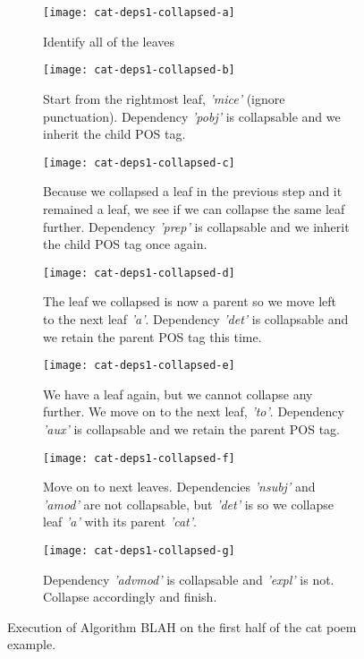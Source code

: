 \begin{figure}[h!]
\centering
\begin{subfigure}[t]{0.9\textwidth}
	\centering
    \texttt{[image: cat-deps1-collapsed-a]}
    \caption{Identify all of the leaves}
\end{subfigure}
\begin{subfigure}[t]{0.9\textwidth}
	\centering
    \texttt{[image: cat-deps1-collapsed-b]}
    \caption{Start from the rightmost leaf, \textit{'mice'} (ignore punctuation). Dependency \textit{'pobj'} is collapsable and we inherit the child POS tag.}
\end{subfigure}
\begin{subfigure}[t]{0.9\textwidth}
	\centering
    \texttt{[image: cat-deps1-collapsed-c]}
    \caption{Because we collapsed a leaf in the previous step and it remained a leaf, we see if we can collapse the same leaf further. Dependency \textit{'prep'} is collapsable and we inherit the child POS tag once again.}
\end{subfigure}
\begin{subfigure}[t]{0.9\textwidth}
	\centering
    \texttt{[image: cat-deps1-collapsed-d]}
    \caption{The leaf we collapsed is now a parent so we move left to the next leaf \textit{'a'}. Dependency \textit{'det'} is collapsable and we retain the parent POS tag this time.}
\end{subfigure}
\begin{subfigure}[t]{0.9\textwidth}
	\centering
    \texttt{[image: cat-deps1-collapsed-e]}
    \caption{We have a leaf again, but we cannot collapse any further. We move on to the next leaf, \textit{'to'}. Dependency \textit{'aux'} is collapsable and we retain the parent POS tag.}
\end{subfigure}
\begin{subfigure}[t]{0.9\textwidth}
	\centering
    \texttt{[image: cat-deps1-collapsed-f]}
    \caption{Move on to next leaves. Dependencies \textit{'nsubj'} and \textit{'amod'} are not collapsable, but \textit{'det'} is so we collapse leaf \textit{'a'} with its parent \textit{'cat'}.}
\end{subfigure}
\begin{subfigure}[t]{0.9\textwidth}
	\centering
    \texttt{[image: cat-deps1-collapsed-g]}
    \caption{Dependency \textit{'advmod'} is collapsable and \textit{'expl'} is not. Collapse accordingly and finish.}
    \label{fig:cat-deps1-collapsed-g}
\end{subfigure}
\caption{Execution of Algorithm BLAH on the first half of the cat poem example.}
\label{fig:cat-deps1-collapsed}
\end{figure}

